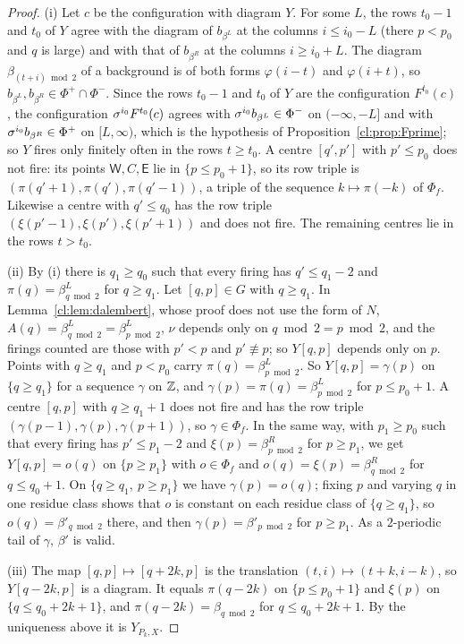 \begin{proof}
(i) Let $c$ be the configuration with diagram $Y$. For some $L$, the rows $t_0-1$ and $t_0$ of $Y$ agree with the diagram of $b_{\beta^L}$ at the columns $i\le i_0-L$ (there $p<p_0$ and $q$ is large) and with that of $b_{\beta^R}$ at the columns $i\ge i_0+L$. The diagram $\beta_{(t+i)\bmod2}$ of a background is of both forms $\varphi(i-t)$ and $\varphi(i+t)$, so $b_{\beta^L},b_{\beta^R}\in\Phi^+\cap\Phi^-$. Since the rows $t_0-1$ and $t_0$ of $Y$ are the configuration $F^{t_0}(c)$, the configuration $\sigma^{i_0}F^{t_0}(c)$ agrees with $\sigma^{i_0}b_{\beta^L}\in\Phi^-$ on $(-\infty,-L]$ and with $\sigma^{i_0}b_{\beta^R}\in\Phi^+$ on $[L,\infty)$, which is the hypothesis of Proposition~\ref{cl:prop:Fprime}; so $Y$ fires only finitely often in the rows $t\ge t_0$. A centre $[q',p']$ with $p'\le p_0$ does not fire: its points $\mathsf W,C,\mathsf E$ lie in $\{p\le p_0+1\}$, so its row triple is $(\pi(q'+1),\pi(q'),\pi(q'-1))$, a triple of the sequence $k\mapsto\pi(-k)$ of $\Phi_f$. Likewise a centre with $q'\le q_0$ has the row triple $(\xi(p'-1),\xi(p'),\xi(p'+1))$ and does not fire. The remaining centres lie in the rows $t>t_0$.

(ii) By (i) there is $q_1\ge q_0$ such that every firing has $q'\le q_1-2$ and $\pi(q)=\beta^L_{q\bmod2}$ for $q\ge q_1$. Let $[q,p]\in G$ with $q\ge q_1$. In Lemma~\ref{cl:lem:dalembert}, whose proof does not use the form of $N$, $A(q)=\beta^L_{q\bmod2}=\beta^L_{p\bmod2}$, $\nu$ depends only on $q\bmod2=p\bmod2$, and the firings counted are those with $p'<p$ and $p'\not\equiv p$; so $Y[q,p]$ depends only on $p$. Points with $q\ge q_1$ and $p<p_0$ carry $\pi(q)=\beta^L_{p\bmod2}$. So $Y[q,p]=\gamma(p)$ on $\{q\ge q_1\}$ for a sequence $\gamma$ on $\mathbb{Z}$, and $\gamma(p)=\pi(q)=\beta^L_{p\bmod2}$ for $p\le p_0+1$. A centre $[q,p]$ with $q\ge q_1+1$ does not fire and has the row triple $(\gamma(p-1),\gamma(p),\gamma(p+1))$, so $\gamma\in\Phi_f$. In the same way, with $p_1\ge p_0$ such that every firing has $p'\le p_1-2$ and $\xi(p)=\beta^R_{p\bmod2}$ for $p\ge p_1$, we get $Y[q,p]=o(q)$ on $\{p\ge p_1\}$ with $o\in\Phi_f$ and $o(q)=\xi(p)=\beta^R_{q\bmod2}$ for $q\le q_0+1$. On $\{q\ge q_1,\ p\ge p_1\}$ we have $\gamma(p)=o(q)$; fixing $p$ and varying $q$ in one residue class shows that $o$ is constant on each residue class of $\{q\ge q_1\}$, so $o(q)=\beta'_{q\bmod2}$ there, and then $\gamma(p)=\beta'_{p\bmod2}$ for $p\ge p_1$. As a $2$-periodic tail of $\gamma$, $\beta'$ is valid.

(iii) The map $[q,p]\mapsto[q+2k,p]$ is the translation $(t,i)\mapsto(t+k,i-k)$, so $Y[q-2k,p]$ is a diagram. It equals $\pi(q-2k)$ on $\{p\le p_0+1\}$ and $\xi(p)$ on $\{q\le q_0+2k+1\}$, and $\pi(q-2k)=\beta_{q\bmod2}$ for $q\le q_0+2k+1$. By the uniqueness above it is $Y_{P_k,X}$.


\end{proof}
